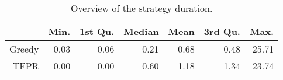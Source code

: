 \begin{table}[ht]
\centering
\begin{tabular}{rrrrrrr}
  \hline
 & Min. & 1st Qu. & Median & Mean & 3rd Qu. & Max. \\ 
  \hline
Greedy & 0.03 & 0.06 & 0.21 & 0.68 & 0.48 & 25.71 \\ 
  TFPR & 0.00 & 0.00 & 0.60 & 1.18 & 1.34 & 23.74 \\ 
   \hline
\end{tabular}
\caption{Overview of the strategy duration.} 
\label{tab:results:rq0:summary:duration}
\end{table}
